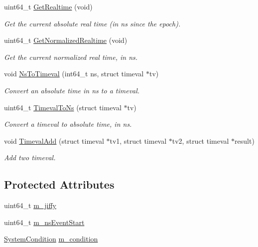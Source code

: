 \begin{DoxyCompactItemize}
uint64\+\_\+t \hyperlink{classns3_1_1WallClockSynchronizer_a9ffb2b0572abca0763b56889a72867dd}{Get\+Realtime} (void)
\begin{DoxyCompactList}\small\item\em Get the current absolute real time (in ns since the epoch). \end{DoxyCompactList}\item 
uint64\+\_\+t \hyperlink{classns3_1_1WallClockSynchronizer_a1a9757f294c7677e211b19ef10867780}{Get\+Normalized\+Realtime} (void)
\begin{DoxyCompactList}\small\item\em Get the current normalized real time, in ns. \end{DoxyCompactList}\item 
void \hyperlink{classns3_1_1WallClockSynchronizer_a2047a1ec83f1c44a50c9d1710486bf66}{Ns\+To\+Timeval} (int64\+\_\+t ns, struct timeval $\ast$tv)
\begin{DoxyCompactList}\small\item\em Convert an absolute time in ns to a {\ttfamily timeval}. \end{DoxyCompactList}\item 
uint64\+\_\+t \hyperlink{classns3_1_1WallClockSynchronizer_a591dbd1a2beb7b8b9bae50ad230204fa}{Timeval\+To\+Ns} (struct timeval $\ast$tv)
\begin{DoxyCompactList}\small\item\em Convert a {\ttfamily timeval} to absolute time, in ns. \end{DoxyCompactList}\item 
void \hyperlink{classns3_1_1WallClockSynchronizer_aa233c2286c253928381210e2edbca532}{Timeval\+Add} (struct timeval $\ast$tv1, struct timeval $\ast$tv2, struct timeval $\ast$result)
\begin{DoxyCompactList}\small\item\em Add two {\ttfamily timeval}. \end{DoxyCompactList}\end{DoxyCompactItemize}
\subsection*{Protected Attributes}
\begin{DoxyCompactItemize}
\item 
uint64\+\_\+t \hyperlink{classns3_1_1WallClockSynchronizer_a2bf669a1ab0a9238dc67ad692b2dfc61}{m\+\_\+jiffy}
\item 
uint64\+\_\+t \hyperlink{classns3_1_1WallClockSynchronizer_a9fff0bee75a2317a2369794698f2a78a}{m\+\_\+ns\+Event\+Start}
\item 
\hyperlink{classns3_1_1SystemCondition}{System\+Condition} \hyperlink{classns3_1_1WallClockSynchronizer_a759454003565834a88fa197887652b65}{m\+\_\+condition}
\end{DoxyCompactItemize}
